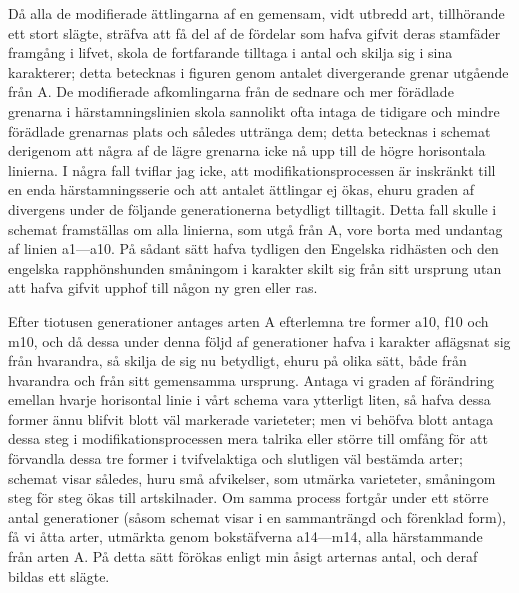 Då alla de modifierade ättlingarna af en gemensam, vidt utbredd art, tillhörande ett stort slägte, sträfva att få del af de fördelar som hafva gifvit deras stamfäder framgång i lifvet, skola de fortfarande tilltaga i antal och skilja sig i sina karakterer; detta betecknas i figuren genom antalet divergerande grenar utgående från A. De modifierade afkomlingarna från de sednare och mer förädlade grenarna i härstamningslinien skola sannolikt ofta intaga de tidigare och mindre förädlade grenarnas plats och således uttränga dem; detta betecknas i schemat derigenom att några af de lägre grenarna icke nå upp till de högre horisontala linierna. I några fall tviflar jag icke, att modifikationsprocessen är inskränkt till en enda härstamningsserie och att antalet ättlingar ej ökas, ehuru graden af divergens under de följande generationerna betydligt tilltagit. Detta fall skulle i schemat framställas om alla linierna, som utgå från A, vore borta med undantag af linien a1—a10. På sådant sätt hafva tydligen den Engelska ridhästen och den engelska rapphönshunden småningom i karakter skilt sig från sitt ursprung utan att hafva gifvit upphof till någon ny gren eller ras.

Efter tiotusen generationer antages arten A efterlemna tre former a10, f10 och m10, och då dessa under denna följd af generationer hafva i karakter aflägsnat sig från hvarandra, så skilja de sig nu betydligt, ehuru på olika sätt, både från hvarandra och från sitt gemensamma ursprung. Antaga vi graden af förändring emellan hvarje horisontal linie i vårt schema vara ytterligt liten, så hafva dessa former ännu blifvit blott väl markerade varieteter; men vi behöfva blott antaga dessa steg i modifikationsprocessen mera talrika eller större till omfång för att förvandla dessa tre former i tvifvelaktiga och slutligen väl bestämda arter; schemat visar således, huru små afvikelser, som utmärka varieteter, småningom steg för steg ökas till artskilnader. Om samma process fortgår under ett större antal generationer (såsom schemat visar i en sammanträngd och förenklad form), få vi åtta arter, utmärkta genom bokstäfverna a14—m14, alla härstammande från arten A. På detta sätt förökas enligt min åsigt arternas antal, och deraf bildas ett slägte.

